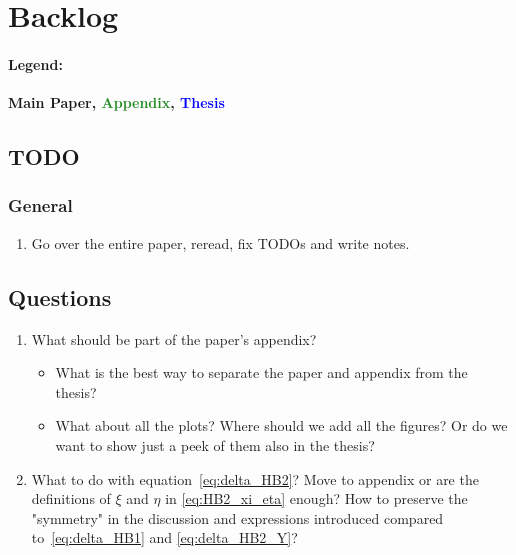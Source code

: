 \section{\textcolor{BrickRed}{Backlog}}

\paragraph{Legend:}
\textbf{\textcolor{BrickRed}{Main Paper}, \textcolor{ForestGreen}{Appendix}, \textcolor{Blue}{Thesis}} 

\subsection{TODO}

\subsubsection{General}
\begin{enumerate}
    \item \textcolor{BrickRed}{Go over the entire paper, reread, fix TODOs and write notes.}
\end{enumerate}

\subsection{Questions}
\begin{enumerate}
    \item What should be part of the paper's appendix?
    \begin{itemize}
        \item What is the best way to separate the paper and appendix from the thesis?
        \item What about all the plots? Where should we add all the figures? Or do we want to show just a peek of them also in the thesis?
    \end{itemize}
    \item What to do with equation~\ref{eq:delta_HB2}? Move to appendix or are the definitions of \(\xi\) and \(\eta\) in \ref{eq:HB2_xi_eta} enough? How to preserve the "symmetry" in the discussion and expressions introduced compared to~\ref{eq:delta_HB1} and \ref{eq:delta_HB2_Y}?
\end{enumerate}
